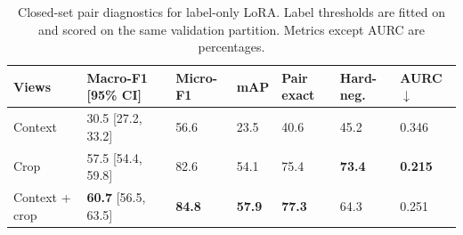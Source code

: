 \begin{table}[t]
\centering
\caption{Closed-set pair diagnostics for label-only LoRA. Label thresholds are fitted on and scored on the same validation partition. Metrics except AURC are percentages.}
\label{tab:development_closed}
\footnotesize
\begin{tabularx}{\textwidth}{@{}l C{2.2cm} C{1.2cm} C{1.05cm} C{1.25cm} C{1.25cm} C{1.0cm}@{}}
\toprule
Views & Macro-F1 [95\% CI] & Micro-F1 & mAP & Pair exact & Hard-neg. & AURC $\downarrow$ \\
\midrule
Context & 30.5 [27.2, 33.2] & 56.6 & 23.5 & 40.6 & 45.2 & 0.346 \\
Crop & 57.5 [54.4, 59.8] & 82.6 & 54.1 & 75.4 & \textbf{73.4} & \textbf{0.215} \\
Context + crop & \textbf{60.7} [56.5, 63.5] & \textbf{84.8} & \textbf{57.9} & \textbf{77.3} & 64.3 & 0.251 \\
\bottomrule
\end{tabularx}
\end{table}
